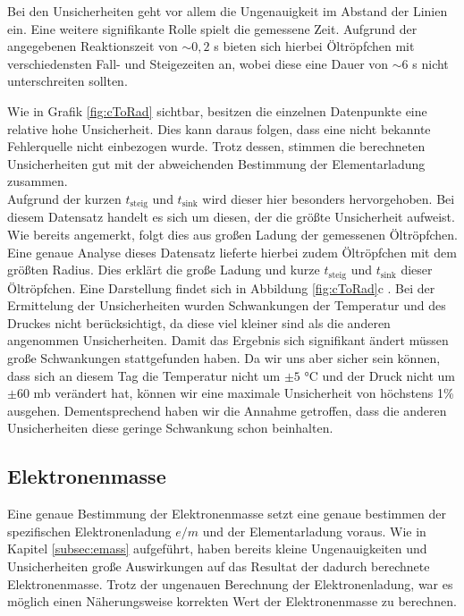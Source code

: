\documentclass[a4paper,usenatbib]{aspdoc}
\begin{document}
             \noindent Bei den Unsicherheiten geht vor allem die Ungenauigkeit im Abstand der Linien ein. Eine weitere signifikante Rolle spielt die gemessene Zeit. Aufgrund der angegebenen Reaktionszeit von $\sim0,2$ s bieten sich hierbei Öltröpfchen mit verschiedensten Fall- und Steigezeiten an, wobei diese eine Dauer von $\sim 6$ s nicht unterschreiten sollten.
             
             \noindent Wie in Grafik \ref{fig:cToRad} sichtbar, besitzen die einzelnen Datenpunkte eine relative hohe Unsicherheit. Dies kann daraus folgen, dass eine nicht bekannte Fehlerquelle nicht einbezogen wurde. Trotz dessen, stimmen die berechneten Unsicherheiten gut mit der abweichenden Bestimmung der Elementarladung zusammen.\\
             Aufgrund der kurzen $t_{\mathrm{steig}}$ und $t_{\mathrm{sink}}$ wird dieser hier besonders hervorgehoben. Bei diesem Datensatz handelt es sich um diesen, der die größte Unsicherheit aufweist. Wie bereits angemerkt, folgt dies aus großen Ladung der gemessenen Öltröpfchen. Eine genaue Analyse dieses Datensatz lieferte hierbei zudem Öltröpfchen mit dem größten Radius. Dies erklärt die große Ladung und kurze $t_{\mathrm{steig}}$ und $t_{\mathrm{sink}}$ dieser Öltröpfchen. Eine Darstellung findet sich in Abbildung \ref{fig:cToRad}c .
             Bei der Ermittelung der Unsicherheiten wurden Schwankungen der Temperatur und des Druckes nicht berücksichtigt, da diese viel kleiner sind als die anderen angenommen Unsicherheiten. Damit das Ergebnis sich signifikant ändert müssen große Schwankungen stattgefunden haben. Da wir uns aber sicher sein können, dass sich an diesem Tag die Temperatur nicht um $\pm 5$ °C und der Druck nicht um $\pm 60$ mb verändert hat, können wir eine maximale Unsicherheit von höchstens 1\% ausgehen. Dementsprechend haben wir die Annahme getroffen, dass die anderen Unsicherheiten diese geringe Schwankung schon beinhalten.
             
             
         \subsection{Elektronenmasse}
            Eine genaue Bestimmung der Elektronenmasse setzt eine genaue bestimmen der spezifischen Elektronenladung $e/m$ und der Elementarladung voraus. Wie in Kapitel \ref{subsec:emass} aufgeführt, haben bereits kleine Ungenauigkeiten und Unsicherheiten große Auswirkungen auf das Resultat der dadurch berechnete Elektronenmasse. Trotz der ungenauen Berechnung der Elektronenladung, war es möglich einen Näherungsweise korrekten Wert der Elektronenmasse zu berechnen.
            
\end{document}
